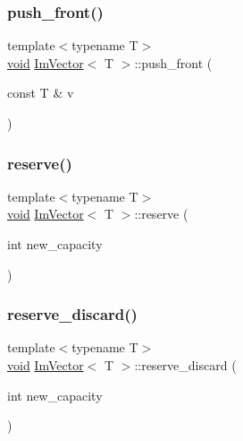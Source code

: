\mbox{\label{structImVector_a168658df8e0e1df5698ebe7a69946389}} 
\subsubsection{\texorpdfstring{push\+\_\+front()}{push\_front()}}
{\footnotesize\ttfamily template$<$typename T$>$ \\
\hyperlink{imgui__impl__opengl3__loader_8h_ac668e7cffd9e2e9cfee428b9b2f34fa7}{void} \hyperlink{structImVector}{Im\+Vector}$<$ T $>$\+::push\+\_\+front (\begin{DoxyParamCaption}\item[{const T \&}]{v }\end{DoxyParamCaption})\hspace{0.3cm}{\ttfamily [inline]}}

\mbox{\label{structImVector_a0f14f5736c3372157856eebb67123b75}} 
\subsubsection{\texorpdfstring{reserve()}{reserve()}}
{\footnotesize\ttfamily template$<$typename T$>$ \\
\hyperlink{imgui__impl__opengl3__loader_8h_ac668e7cffd9e2e9cfee428b9b2f34fa7}{void} \hyperlink{structImVector}{Im\+Vector}$<$ T $>$\+::reserve (\begin{DoxyParamCaption}\item[{int}]{new\+\_\+capacity }\end{DoxyParamCaption})\hspace{0.3cm}{\ttfamily [inline]}}

\mbox{\label{structImVector_a4120d4da7804ae0a34aa521dbb8e1994}} 
\subsubsection{\texorpdfstring{reserve\+\_\+discard()}{reserve\_discard()}}
{\footnotesize\ttfamily template$<$typename T$>$ \\
\hyperlink{imgui__impl__opengl3__loader_8h_ac668e7cffd9e2e9cfee428b9b2f34fa7}{void} \hyperlink{structImVector}{Im\+Vector}$<$ T $>$\+::reserve\+\_\+discard (\begin{DoxyParamCaption}\item[{int}]{new\+\_\+capacity }\end{DoxyParamCaption})\hspace{0.3cm}{\ttfamily [inline]}}

